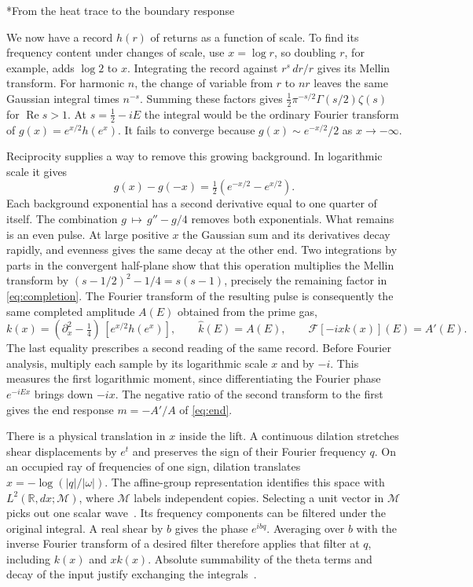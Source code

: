 \documentclass[11pt,letterpaper]{article}
\makeatletter
\renewcommand\subsection{\@startsection{subsection}{2}{\z@}{-2.0ex plus -.3ex}{.75ex}{\normalfont\normalsize\itshape}}
\numberwithin{equation}{section}
\makeatother
\begin{document}
\subsection*{From the heat trace to the boundary response}

We now have a record $h(r)$ of returns as a function of scale. To find its frequency content under changes of scale, use $x=\log r$, so doubling $r$, for example, adds $\log 2$ to $x$. Integrating the record against $r^s\,dr/r$ gives its Mellin transform. For harmonic $n$, the change of variable from $r$ to $nr$ leaves the same Gaussian integral times $n^{-s}$. Summing these factors gives $\tfrac12\pi^{-s/2}\Gamma(s/2)\zeta(s)$ for $\operatorname{Re}s>1$. At $s=\tfrac12-iE$ the integral would be the ordinary Fourier transform of $g(x)=e^{x/2}h(e^x)$. It fails to converge because $g(x)\sim e^{-x/2}/2$ as $x\to-\infty$.

Reciprocity supplies a way to remove this growing background. In logarithmic scale it gives
\[
 g(x)-g(-x)=\tfrac12(e^{-x/2}-e^{x/2}).
\]
Each background exponential has a second derivative equal to one quarter of itself. The combination $g\,\mapsto\,g''-g/4$ removes both exponentials. What remains is an even pulse. At large positive $x$ the Gaussian sum and its derivatives decay rapidly, and evenness gives the same decay at the other end. Two integrations by parts in the convergent half-plane show that this operation multiplies the Mellin transform by $(s-1/2)^2-1/4=s(s-1)$, precisely the remaining factor in \eqref{eq:completion}. The Fourier transform of the resulting pulse is consequently the same completed amplitude $A(E)$ obtained from the prime gas,
\begin{equation}
 k(x)=(\partial_x^2-\tfrac14)\,[e^{x/2}h(e^x)],\qquad
 \widehat k(E)=A(E),\qquad \mathcal F[-ix k(x)](E)=A'(E).
 \label{eq:pulse}
\end{equation}
The last equality prescribes a second reading of the same record. Before Fourier analysis, multiply each sample by its logarithmic scale $x$ and by $-i$. This measures the first logarithmic moment, since differentiating the Fourier phase $e^{-iEx}$ brings down $-ix$. The negative ratio of the second transform to the first gives the end response $m=-A'/A$ of \eqref{eq:end}.

There is a physical translation in $x$ inside the lift. A continuous dilation stretches shear displacements by $e^t$ and preserves the sign of their Fourier frequency $q$. On an occupied ray of frequencies of one sign, dilation translates $x=-\log(|q|/|\omega|)$. The affine-group representation identifies this space with $L^2(\mathbb R,dx;\mathcal M)$, where $\mathcal M$ labels independent copies. Selecting a unit vector in $\mathcal M$ picks out one scalar wave~\cite{affine}. Its frequency components can be filtered under the original integral. A real shear by $b$ gives the phase $e^{ibq}$. Averaging over $b$ with the inverse Fourier transform of a desired filter therefore applies that filter at $q$, including $k(x)$ and $xk(x)$. Absolute summability of the theta terms and decay of the input justify exchanging the integrals~\cite{thetamixed}.
\end{document}
